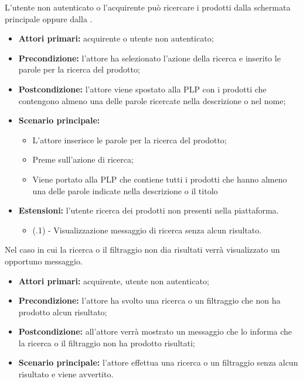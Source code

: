 L'utente non autenticato o l'acquirente può ricercare i prodotti dalla schermata principale oppure dalla .
\begin{itemize}
    \item \textbf{Attori primari:} acquirente o utente non autenticato;
    \item \textbf{Precondizione:} l'attore ha selezionato l'azione della ricerca e inserito le parole per la ricerca del prodotto;
    \item \textbf{Postcondizione:} l'attore viene spostato alla PLP con i prodotti che contengono almeno una delle parole ricercate nella descrizione o nel nome;
    \item \textbf{Scenario principale:} 
    \begin{itemize}
        \item L'attore inserisce le parole per la ricerca del prodotto;
        \item Preme sull'azione di ricerca;
        \item Viene portato alla PLP che contiene tutti i prodotti che hanno almeno una delle parole indicate nella descrizione o il titolo
    \end{itemize}
    \item \textbf{Estensioni:} l'utente ricerca dei prodotti non presenti nella piattaforma.
    \begin{itemize}
    	\item (\actualUC.1) - Visualizzazione messaggio di ricerca senza alcun risultato.
    \end{itemize}
\end{itemize}

\resetSubUC

Nel caso in cui la ricerca o il filtraggio non dia risultati verrà visualizzato un opportuno messaggio.
\begin{itemize}
	\item \textbf{Attori primari:} acquirente, utente non autenticato;
	\item \textbf{Precondizione:} l'attore ha svolto una ricerca o un filtraggio che non ha prodotto alcun risultato;
	\item \textbf{Postcondizione:} all'attore verrà mostrato un messaggio che lo informa che la ricerca o il filtraggio non ha prodotto risultati;
	\item \textbf{Scenario principale:} l'attore effettua una ricerca o un filtraggio senza alcun risultato e viene avvertito.
\end{itemize}

